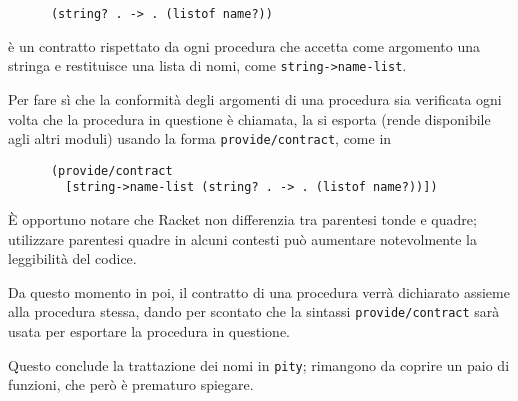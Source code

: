 \begin{lstlisting}
      (string? . -> . (listof name?))
\end{lstlisting}

\`e un contratto rispettato da ogni procedura che accetta come argomento una
stringa e restituisce una lista di nomi, come \lstinline{string->name-list}.

Per fare s\`i che la conformit\`a degli argomenti di una procedura sia
verificata ogni volta che la procedura in questione \`e chiamata, la si
esporta (rende disponibile agli altri moduli) usando la forma
\lstinline{provide/contract}, come in

\begin{lstlisting}
      (provide/contract
        [string->name-list (string? . -> . (listof name?))])
\end{lstlisting}

\`E opportuno notare che Racket non differenzia tra parentesi tonde e quadre;
utilizzare parentesi quadre in alcuni contesti pu\`o aumentare notevolmente
la leggibilit\`a del codice.

Da questo momento in poi, il contratto di una procedura verr\`a dichiarato
assieme alla procedura stessa, dando per scontato che la sintassi
\lstinline{provide/contract} sar\`a usata per esportare la procedura in
questione.

Questo conclude la trattazione dei nomi in \lstinline{pity}; rimangono da
coprire un paio di funzioni, che per\`o \`e prematuro spiegare.
